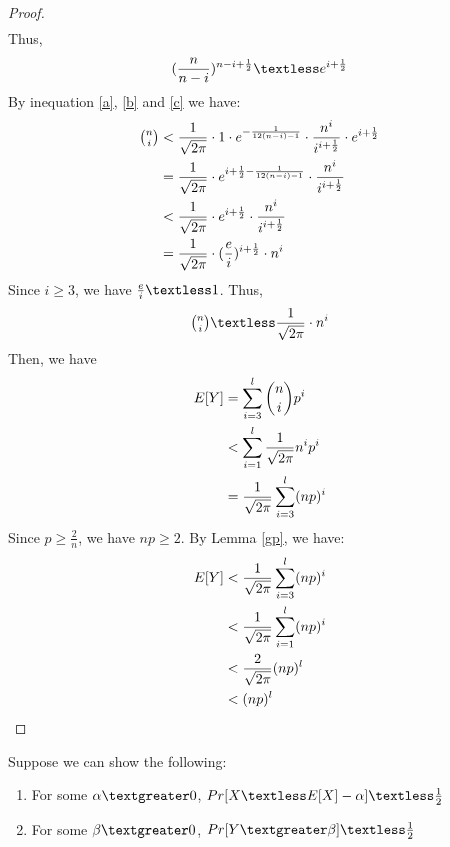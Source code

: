 \begin{proof}
\begin{align}
\end{align}
Thus, 
\begin{align}
    (\frac{n}{n-i})^{n-i+\frac{1}{2}} \textless e^{i+\frac{1}{2}}\label{c}
\end{align}
By inequation \ref{a}, \ref{b} and \ref{c} we have:
\begin{align}
\nonumber \tbinom{n}{i} &\textless \frac{1}{\sqrt{2\pi}}\cdot 1\cdot e^{-\frac{1}{12(n-i)-1}} \cdot \frac{n^i}{i^{i+\frac{1}{2}}} \cdot e^{i+\frac{1}{2}}\\
\nonumber &= \frac{1}{\sqrt{2\pi}}\cdot e^{i+\frac{1}{2}-\frac{1}{12(n-i)-1}} \cdot \frac{n^i}{i^{i+\frac{1}{2}}}\\
\nonumber &\textless \frac{1}{\sqrt{2\pi}}\cdot e^{i+\frac{1}{2}} \cdot \frac{n^i}{i^{i+\frac{1}{2}}}\\
\nonumber &= \frac{1}{\sqrt{2\pi}}\cdot (\frac{e}{i})^{i+\frac{1}{2}}\cdot n^i
\end{align}
Since $i\ge 3$, we have $\frac{e}{i}\textless 1$. Thus,
\begin{align}
    \nonumber \tbinom{n}{i} \textless \frac{1}{\sqrt{2\pi}}\cdot n^i
\end{align}
Then, we have
\begin{align}
    \nonumber E[Y] &= \sum_{i = 3}^{l}{\binom{n}{i} p^i} 
    \\
    \nonumber &\textless \sum_{i=1}^{l}\frac{1}{\sqrt{2\pi}}n^ip^i\\
    \nonumber &= \frac{1}{\sqrt{2\pi}}\sum_{i=3}^{l}(np)^i
\end{align}
Since $p \ge \frac{2}{n}$, we have $np\ge 2$.
By Lemma \ref{gp}, we have:
\begin{align}
    \nonumber E[Y]& \textless   \frac{1}{\sqrt{2\pi}}\sum_{i=3}^{l}(np)^i \\
    \nonumber & \textless \frac{1}{\sqrt{2\pi}}\sum_{i=1}^{l}(np)^i \\
    \nonumber & \textless \frac{2}{\sqrt{2\pi}}(np)^l\\
    \nonumber & \textless (np)^l
\end{align}


\end{proof}
Suppose we can show the following:
\begin{enumerate}
    \item For some $\alpha \textgreater 0$, $Pr[X\textless E[X]-\alpha] \textless \frac{1}{2}$
    \item For some $\beta \textgreater 0$, $Pr[Y \textgreater \beta]\textless \frac{1}{2}$
\end{enumerate}
